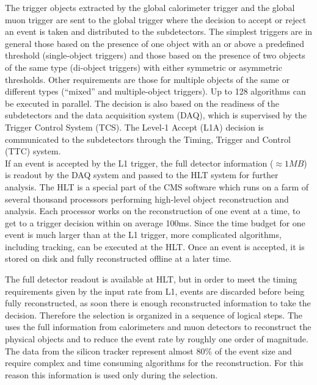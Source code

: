 The trigger objects extracted by the global calorimeter trigger and the global muon trigger are sent to the global trigger where the decision to accept or reject an event is taken and distributed to the subdetectors. 
The simplest triggers are in general those based on the presence of one object with an \ET or \PT above a predefined threshold (single-object triggers) and those based on the presence of two objects of the same type (di-object triggers) with either symmetric or asymmetric thresholds. Other requirements are those for multiple objects of the same or different types (``mixed'' and multiple-object triggers). Up to 128 algorithms can be executed in parallel.
The decision is also based on the readiness of the subdetectors and the data acquisition system (DAQ), which is supervised by the Trigger Control System (TCS). The Level-1 Accept (L1A) decision is communicated to the subdetectors through the Timing, Trigger and Control (TTC) system.\\ 

If an event is accepted by the L1 trigger, the full detector information ($\approx1\unit{MB}$) is readout by the DAQ system and passed to the HLT system for further analysis. The HLT is a special part of the CMS software which runs on a farm of several thousand processors performing high-level object reconstruction and analysis.
Each processor works on the reconstruction of one event at a time, to get to a trigger decision within on average 100\unit{ms}. Since the time budget for one event is much larger than at the L1 trigger, more complicated algorithms, including tracking, can be executed at the HLT. Once an event is accepted, it is stored on disk and fully reconstructed offline at a later time. 

The full detector readout is available at HLT, but in order to meet the timing requirements given by the input rate from L1, events are discarded before being fully reconstructed, as soon there is enough reconstructed information to take the decision. Therefore the selection is organized in a sequence of logical steps. The \Ltwo uses the full information from calorimeters and muon detectors to reconstruct the physical objects and to reduce the event rate by roughly one order of magnitude. The data from the silicon tracker represent almost 80\% of the event size and require complex and time consuming algorithms for the reconstruction. For this reason this information is used only during the \Lthree selection.

